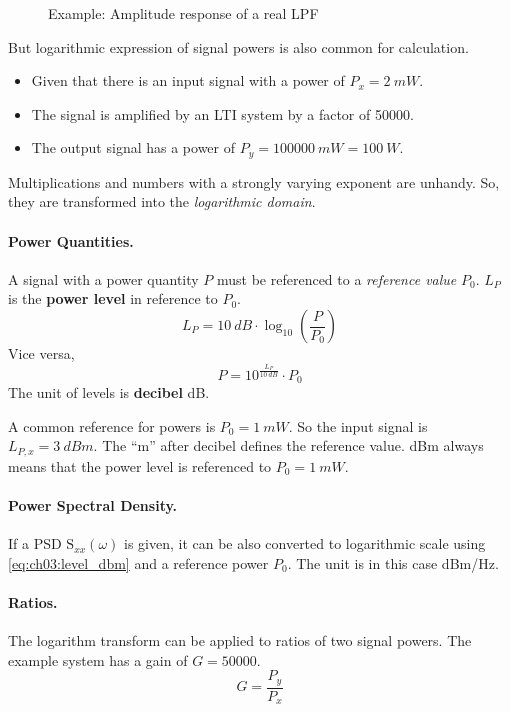 \begin{refsection}
\begin{figure}[H]
	\caption[Example: Amplitude response of a real \acl{LPF}]{Example: Amplitude response of a real \ac{LPF}}
\end{figure}

But logarithmic expression of signal powers is also common for calculation.
\begin{itemize}
	\item Given that there is an input signal with a power of $P_x = \SI{2}{mW}$.
	\item The signal is amplified by an \ac{LTI} system by a factor of \num{50000}.
	\item The output signal has a power of $P_y = \SI{100000}{mW} = \SI{100}{W}$.
\end{itemize}

Multiplications and numbers with a strongly varying exponent are unhandy. So, they are transformed into the \emph{logarithmic domain}.

\paragraph{Power Quantities.}
A signal with a power quantity $P$ must be referenced to a \emph{reference value} $P_0$. $L_P$ is the  \textbf{power level} in reference to $P_0$.
\begin{equation}
	L_P = \SI{10}{dB} \cdot \log_{10} \left(\frac{P}{P_0}\right)
	\label{eq:ch03:level_dbm}
\end{equation}
Vice versa,
\begin{equation}
	P = 10^{\frac{L_P}{\SI{10}{dB}}} \cdot P_0
\end{equation}
The unit of levels is  \textbf{decibel} \si{dB}.

A common reference for powers is $P_0 = \SI{1}{mW}$. So the input signal is $L_{P,x} = \SI{3}{dBm}$. The ``m'' after decibel defines the reference value. \si{dBm} always means that the power level is referenced to $P_0 = \SI{1}{mW}$.

\paragraph{Power Spectral Density.}

If a \ac{PSD} $\mathrm{S}_{xx}(\omega)$ is given, it can be also converted to logarithmic scale using \eqref{eq:ch03:level_dbm} and a reference power $P_0$. The unit is in this case \si{dBm/Hz}.

\paragraph{Ratios.}
The logarithm transform can be applied to ratios of two signal powers. The example system has a gain of $G = 50000$.
\begin{equation}
	G = \frac{P_y}{P_x}
\end{equation}


\end{refsection}
